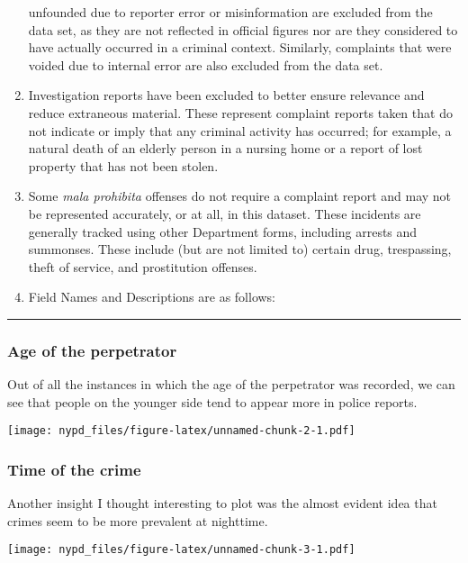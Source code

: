 \documentclass[
]{article}
\begin{document}
\begin{enumerate}
  unfounded due to reporter error or misinformation are excluded from
  the data set, as they are not reflected in official figures nor are
  they considered to have actually occurred in a criminal context.
  Similarly, complaints that were voided due to internal error are also
  excluded from the data set.
\item
  Investigation reports have been excluded to better ensure relevance
  and reduce extraneous material. These represent complaint reports
  taken that do not indicate or imply that any criminal activity has
  occurred; for example, a natural death of an elderly person in a
  nursing home or a report of lost property that has not been stolen.
\item
  Some \emph{mala prohibita} offenses do not require a complaint report
  and may not be represented accurately, or at all, in this dataset.
  These incidents are generally tracked using other Department forms,
  including arrests and summonses. These include (but are not limited
  to) certain drug, trespassing, theft of service, and prostitution
  offenses.
\item
  Field Names and Descriptions are as follows:
\end{enumerate}

\begin{center}\rule{0.5\linewidth}{0.5pt}\end{center}

\hypertarget{age-of-the-perpetrator}{%
\subsubsection{Age of the perpetrator}\label{age-of-the-perpetrator}}

Out of all the instances in which the age of the perpetrator was
recorded, we can see that people on the younger side tend to appear more
in police reports.

\texttt{[image: nypd\_files/figure-latex/unnamed-chunk-2-1.pdf]}

\hypertarget{time-of-the-crime}{%
\subsubsection{Time of the crime}\label{time-of-the-crime}}

Another insight I thought interesting to plot was the almost evident
idea that crimes seem to be more prevalent at nighttime.

\texttt{[image: nypd\_files/figure-latex/unnamed-chunk-3-1.pdf]}
\end{document}
